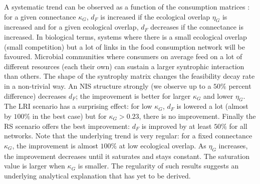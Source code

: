 \documentclass[12pt, titlepage]{report}
\begin{document}
  \noindent A systematic trend can be observed as a function of the consumption matrices%
  : for a given connectance $\kappa_G$, $d_F$ is increased if the ecological overlap $\eta_G$ is increased and for a given ecological overlap, $d_F$ decreases if the connectance is increased.
  In biological terms, systems where there is a small ecological overlap (\ie small competition) but a lot of links in the food consumption network will be favoured. Microbial communities where consumers on average feed on a lot of different resources (\ie each their own) can sustain a larger syntrophic interaction than others. The shape of the syntrophy matrix changes the feasibility decay rate in a non-trivial way. An NIS structure strongly (we observe up to a $50\%$ percent difference) decreases $d_F$; the improvement is better for larger $\kappa_G$ and lower $\eta_G$. The LRI scenario has a surprising effect: for low $\kappa_G$, $d_F$ is lowered a lot (almost by $100\%$ in the best case) but for $\kappa_G > 0.23$, there is no improvement. Finally the RS scenario offers the best improvement: $d_F$ is improved by at least $50\%$ for all networks. Note that the underlying trend is very regular: for a fixed connectance $\kappa_G$, the improvement is almost $100\%$ at low ecological overlap. As $\eta_G$ increases, the improvement decreases until it saturates and stays constant. The saturation value is larger when $\kappa_G$ is smaller. The regularity of such results suggests an underlying analytical explanation that has yet to be derived.

\end{document}
